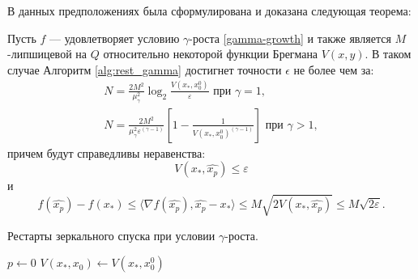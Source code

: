 В данных предположениях была сформулирована и доказана следующая теорема:
\begin{theorem} \label{simple_restart}
    Пусть $f$ --- удовлетворяет условию $\gamma$-роста \eqref{gamma-growth} и также является $M$-липшицевой на $Q$ относительно некоторой функции Брегмана $V(x, y)$. В таком случае Алгоритм \ref{alg:rest_gamma} достигнет точности $\epsilon$ не более чем за:
    \begin{equation}
    \begin{aligned}
       N =\frac{2 M^2}{\mu_{\gamma}^2} \log_2{\frac{V(x_*, x_0^0)}{\varepsilon}} \text{ при } \gamma = 1, \\
       N = \frac{2 M^2}{\mu_{\gamma}^2 \varepsilon^{(\gamma-1)} } \left[1 - \frac{1} {V(x_*, x_0^0)^{(\gamma - 1)}}\right] \text{ при } \gamma > 1,
    \end{aligned}
    \end{equation}
    причем будут справедливы неравенства:
    \begin{equation}
       V(x_*, \widehat{x_p}) \leq \varepsilon
    \end{equation}
    и
    \begin{equation}
        f(\widehat{x_p}) - f(x_*) \leq  \langle \nabla f(\widehat{x_p}), \widehat{x_p} - x_* \rangle \leq M \sqrt{ 2 V(x_*, \widehat{x_p})} \leq M \sqrt{2 \varepsilon}.  
    \end{equation}
\end{theorem}

\begin{algorithm}[htp]
    \caption{Рестарты зеркального спуска при условии $\gamma$-роста.}
    \label{alg:rest_gamma}
    $p \gets 0$\;
    $V(x_*, x_0) \gets V(x_*,x_0^0)$\;
\end{algorithm}


